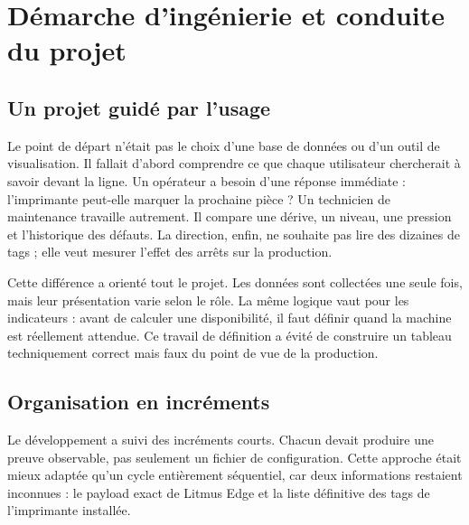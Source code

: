 \chapter{Démarche d'ingénierie et conduite du projet}

\section{Un projet guidé par l'usage}

Le point de départ n'était pas le choix d'une base de données ou d'un outil
de visualisation. Il fallait d'abord comprendre ce que chaque utilisateur
chercherait à savoir devant la ligne. Un opérateur a besoin d'une réponse
immédiate : l'imprimante peut-elle marquer la prochaine pièce ? Un technicien
de maintenance travaille autrement. Il compare une dérive, un niveau, une
pression et l'historique des défauts. La direction, enfin, ne souhaite pas lire
des dizaines de tags ; elle veut mesurer l'effet des arrêts sur la production.

Cette différence a orienté tout le projet. Les données sont collectées une
seule fois, mais leur présentation varie selon le rôle. La même logique vaut
pour les indicateurs : avant de calculer une disponibilité, il faut définir
quand la machine est réellement attendue. Ce travail de définition a évité de
construire un tableau techniquement correct mais faux du point de vue de la
production.

\section{Organisation en incréments}

Le développement a suivi des incréments courts. Chacun devait produire une
preuve observable, pas seulement un fichier de configuration. Cette approche
était mieux adaptée qu'un cycle entièrement séquentiel, car deux informations
restaient inconnues : le payload exact de Litmus Edge et la liste définitive
des tags de l'imprimante installée.

